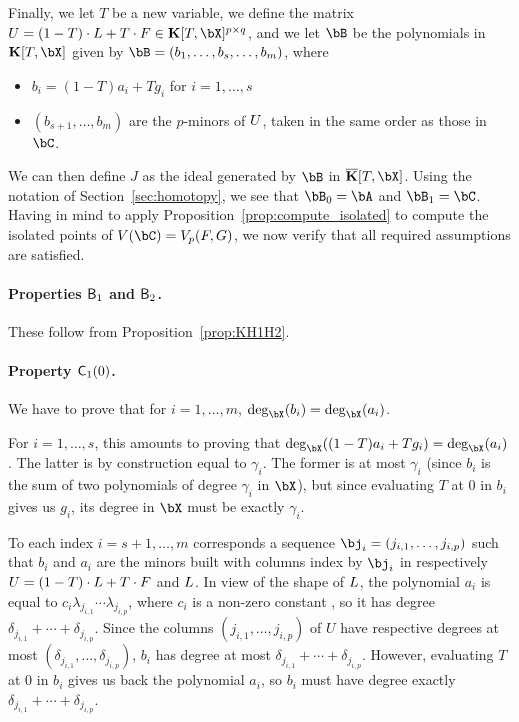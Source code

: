 \documentclass[12pt]{article}
\begin{document}
Finally, we let $T$ be a new variable, we define the matrix
$\mU=(1-T)\cdot \mL + T \cdot \mF \in \KK[T,\bX]^{p\times q}$, and we let $\bB$ be the polynomials in
$\KK[T,\bX]$ given by $\bB=(b_1,\dots,b_s,\dots,b_m)$, where
\begin{itemize}
\item $b_i=(1-T) a_i + T g_i$ for $i=1,\dots,s$
\item $(b_{s+1},\dots,b_{m})$ are the $p$-minors of ${U}$, taken in
  the same order as those in $\bC$.
\end{itemize}
We can then define $J$ as the ideal generated by $\bB$ in
$\KKbar[T,\bX]$. Using the notation of Section~\ref{sec:homotopy}, we
see that $\bB_0=\bA$ and $\bB_1=\bC$. Having in mind
to apply Proposition~\ref{prop:compute_isolated} to compute the
isolated points of $V(\bC)=\VpFG{p}{\mF}{G}$, we now verify that all
required assumptions are satisfied.

\paragraph{Properties $\mathsf{B}_1$ and $\mathsf{B}_2$.}
These follow from Proposition~\ref{prop:KH1H2}.

\paragraph{Property $\mathsf{C}_1(0)$.} We have to prove that for $i=1,\dots,m$,
$\deg_\bX(b_i)=\deg_\bX(a_i)$. 

For $i=1,\dots,s$, this amounts to proving that $\deg_\bX((1-T) a_i +
T g_i)=\deg_\bX(a_i)$. The latter is by construction equal to
$\gamma_i$. The former is at most $\gamma_i$ (since $b_i$ is the sum
of two polynomials of degree $\gamma_i$ in $\bX$), but since
evaluating $T$ at $0$ in $b_i$ gives us $g_i$, its degree in $\bX$
must be exactly $\gamma_i$.

To each index $i=s+1,\dots,m$ corresponds a sequence
$\bj_i=(j_{i,1},\dots,j_{i,p})$ such that $b_i$ and $a_i$ are the
minors built with columns index by $\bj_i$ in respectively
${U}=(1-T)\cdot {L} + T \cdot {F}$ and ${L}$. In view of the shape of
${L}$, the polynomial $a_i$ is equal to $c_i\lambda_{j_{i,1}}\cdots
\lambda_{j_{i,p}}$, where $c_i$ is a non-zero constant
, so it has degree $\delta_{j_{i,1}} +
\cdots + \delta_{j_{i,p}}$.  Since the columns
$(j_{i,1},\dots,j_{i,p})$ of $U$ have respective degrees at most
$(\delta_{j_{i,1}},\dots,\delta_{j_{i,p}})$, $b_i$ has degree at most
$\delta_{j_{i,1}} + \cdots + \delta_{j_{i,p}}$. However, evaluating
$T$ at $0$ in $b_i$ gives us back the polynomial $a_i$, so $b_i$ must
have degree exactly $\delta_{j_{i,1}} + \cdots + \delta_{j_{i,p}}$.
\end{document}
